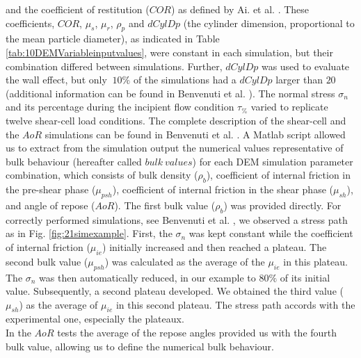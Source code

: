 \documentclass{llncs}
\begin{document}
and the coefficient of restitution ($COR$) as defined by Ai. et al. \cite{RefWorks:131}.
These coefficients, $COR$, $\mu_s$, $\mu_r$,
$\rho_p$ and $dCylDp$ (the cylinder dimension, proportional to the mean
particle diameter), as indicated in Table \ref{tab:10DEMVariableinputvalues}, 
were constant in each simulation, but their combination differed between
simulations.
Further, $dCylDp$ was used to evaluate the wall effect, but only $~10\%$ of the
simulations had a $dCylDp$ larger than $20$ (additional information can be found
in Benvenuti et al. \cite{RefWorks:180}).
The normal stress $\sigma_n$ and its
percentage during the incipient flow condition $\tau_{\%}$
varied to replicate twelve shear-cell load conditions. 
The complete description of the shear-cell 
and the $AoR$ simulations
can be found in Benvenuti et al. \cite{RefWorks:180}.
A Matlab script allowed us to extract from the simulation output the numerical
values representative of bulk behaviour (hereafter called $bulk ~ values$)
for each DEM simulation parameter combination, which consists of
bulk density ($\rho_b$),
coefficient of internal friction in the pre-shear phase ($\mu_{psh}$),
coefficient of internal friction in the shear phase ($\mu_{sh}$),
and angle of repose ($AoR$).
The first bulk value ($\rho_b$) was provided directly. 
For correctly performed simulations, see Benvenuti et al. \cite{RefWorks:180}, we
observed a stress path as in Fig. \ref{fig:21simexample}.
First, the $\sigma_n$ was kept constant while the coefficient of internal
friction ($\mu_{ie}$) initially increased and then reached a plateau.
The second bulk value ($\mu_{psh}$) was calculated as the average of the
$\mu_{ie}$ in this plateau.
The $\sigma_n$ was then automatically reduced, in our example to $80 \%$ of
its initial value.
Subsequently, a second plateau developed.
We obtained the third
value ($\mu_{sh}$) as the average of $\mu_{ie}$ in this second plateau.
The stress path accords with the experimental one, especially the plateaux.\\
In the $AoR$ tests the average of the repose angles provided us with the fourth
bulk value, allowing us to define the numerical bulk behaviour.
\end{document}
